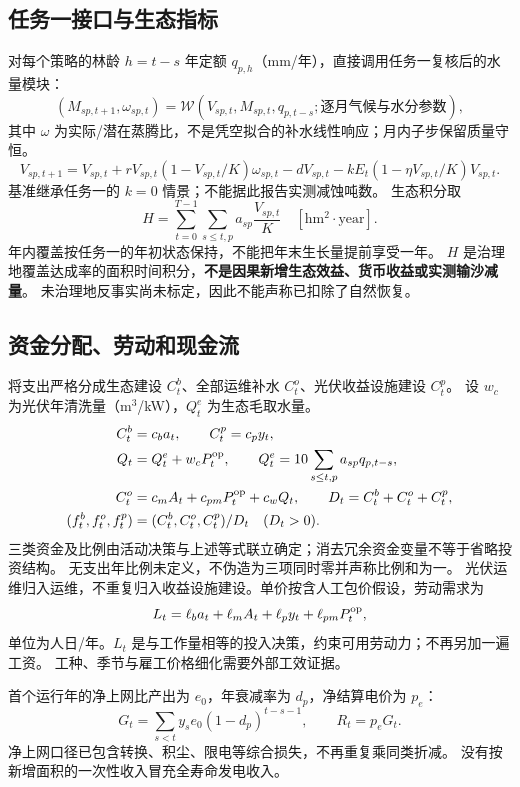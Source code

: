\subsection{任务一接口与生态指标}
对每个策略的林龄 $h=t-s$ 年定额 $q_{p,h}$（mm/年），直接调用任务一复核后的水量模块：
\begin{equation}\label{eq:Ks}
(M_{sp,t+1},\omega_{sp,t})=\mathcal W(V_{sp,t},M_{sp,t},q_{p,t-s};\text{逐月气候与水分参数}),
\end{equation}
其中 $\omega$ 为实际/潜在蒸腾比，不是凭空拟合的补水线性响应；月内子步保留质量守恒。
\begin{equation}\label{eq:xstar2}
V_{sp,t+1}=V_{sp,t}+rV_{sp,t}(1-V_{sp,t}/K)\omega_{sp,t}
-dV_{sp,t}-kE_t(1-\eta V_{sp,t}/K)V_{sp,t}.
\end{equation}
基准继承任务一的 $k=0$ 情景；不能据此报告实测减蚀吨数。
生态积分取
\[
H=\sum_{t=0}^{T-1}\sum_{s\le t,p}a_{sp}\frac{V_{sp,t}}{K}\quad[\mathrm{hm^2\cdot year}].
\]
年内覆盖按任务一的年初状态保持，不能把年末生长量提前享受一年。
$H$ 是治理地覆盖达成率的面积时间积分，\textbf{不是因果新增生态效益、货币收益或实测输沙减量}。
未治理地反事实尚未标定，因此不能声称已扣除了自然恢复。

\subsection{资金分配、劳动和现金流}
将支出严格分成生态建设 $C_t^b$、全部运维补水 $C_t^o$、光伏收益设施建设 $C_t^p$。
设 $w_c$ 为光伏年清洗量（m$^3$/kW），$Q_t^e$ 为生态毛取水量。
\begin{align}
C_t^b&=c_ba_t,\qquad C_t^p=c_py_t,\\
Q_t&=Q_t^e+w_cP_t^{\rm op},\qquad
Q_t^e=10\sum_{s\le t,p}a_{sp}q_{p,t-s},\\
C_t^o&=c_mA_t+c_{pm}P_t^{\rm op}+c_wQ_t,\qquad
D_t=C_t^b+C_t^o+C_t^p,\\
(f_t^b,f_t^o,f_t^p)&=(C_t^b,C_t^o,C_t^p)/D_t\quad(D_t>0).
\end{align}
三类资金及比例由活动决策与上述等式联立确定；消去冗余资金变量不等于省略投资结构。
无支出年比例未定义，不伪造为三项同时零并声称比例和为一。
光伏运维归入运维，不重复归入收益设施建设。单价按含人工包价假设，劳动需求为
\[
L_t=\ell_ba_t+\ell_mA_t+\ell_py_t+\ell_{pm}P_t^{\rm op},
\]
单位为人日/年。$L_t$ 是与工作量相等的投入决策，约束可用劳动力；不再另加一遍工资。
工种、季节与雇工价格细化需要外部工效证据。

首个运行年的净上网比产出为 $e_0$，年衰减率为 $d_p$，净结算电价为 $p_e$：
\[
G_t=\sum_{s<t}y_se_0(1-d_p)^{t-s-1},\qquad R_t=p_eG_t.
\]
净上网口径已包含转换、积尘、限电等综合损失，不再重复乘同类折减。
没有按新增面积的一次性收入冒充全寿命发电收入。

